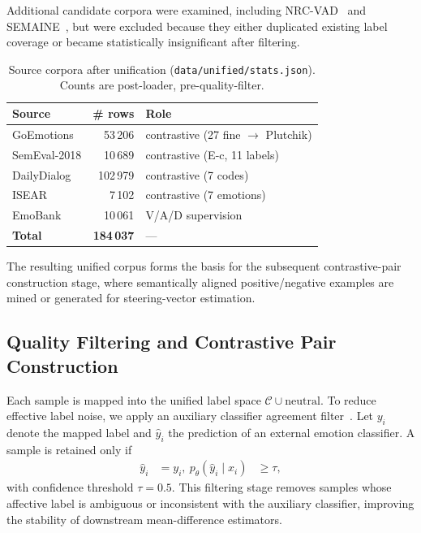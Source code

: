 \documentclass[12pt,twoside]{report}
\begin{document}
Additional candidate corpora were examined, including NRC-VAD~\cite{mohammad2025nrcvadlexiconv2} and SEMAINE~\cite{semaine}, but were excluded because they either duplicated existing label coverage or became statistically insignificant after filtering.

\begin{table}[H]
\centering
\small
\begin{tabular}{lrl}
\toprule
Source & \# rows & Role \\
\midrule
GoEmotions     &  53\,206 & contrastive (27 fine $\to$ Plutchik) \\
SemEval-2018   &  10\,689 & contrastive (E-c, 11 labels) \\
DailyDialog    & 102\,979 & contrastive (7 codes) \\
ISEAR          &   7\,102 & contrastive (7 emotions) \\
EmoBank        &  10\,061 & V/A/D supervision \\
\midrule
\textbf{Total} & \textbf{184\,037} & --- \\
\bottomrule
\end{tabular}
\caption{Source corpora after unification (\texttt{data/unified/stats.json}).
Counts are post-loader, pre-quality-filter.}
\label{tab:dev}
\end{table}

The resulting unified corpus forms the basis for the subsequent contrastive-pair construction stage, where semantically aligned positive/negative examples are mined or generated for steering-vector estimation.

\subsection{Quality Filtering and Contrastive Pair Construction}

Each sample is mapped into the unified label space
$\mathcal{C}\cup{\mathrm{neutral}}$.
To reduce effective label noise, we apply an auxiliary classifier
agreement filter~\cite{hartmann2022emotionenglish}.
Let $y_i$ denote the mapped label and $\hat y_i$ the prediction of an
external emotion classifier.
A sample is retained only if
\begin{align}
\hat y_i &= y_i, \
p_\theta(\hat y_i \mid x_i) &\ge \tau,
\end{align}
with confidence threshold $\tau = 0.5$.
This filtering stage removes samples whose affective label is ambiguous
or inconsistent with the auxiliary classifier, improving the stability
of downstream mean-difference estimators.
\end{document}
